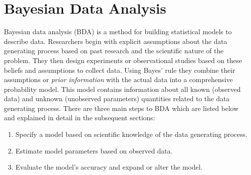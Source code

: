 \documentclass{article}
\begin{document}
\section{Bayesian Data Analysis}
Bayesian data analysis (BDA) is a method for building statistical models to describe data.  Researchers begin with explicit assumptions about the data generating process based on past research and the scientific nature of the problem. They then design experiments or observational studies based on these beliefs and assumptions to collect data. Using Bayes' rule they combine their assumptions or \textit{prior information} with the actual data into a comprehensive probability model. This model contains information about all known (observed data) and unknown (unobserved parameters) quantities related to the data generating process.
There are three main steps to BDA which are listed below and explained in detail in the subsequent sections:
\begin{enumerate}
\item Specify a model based on scientific knowledge of the data generating process.
\item Estimate model parameters based on observed data.
\item Evaluate the model's accuracy and expand or alter the model.
\end{enumerate}
\end{document}
